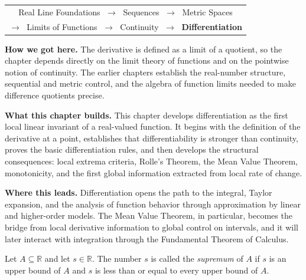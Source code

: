 \begin{tcolorbox}[colback=gray!6, colframe=gray!40, arc=2pt,
  left=8pt, right=8pt, top=6pt, bottom=6pt,
  title={\small\textbf{Differentiation}},
  fonttitle=\small\bfseries]

\begin{center}
\small
\begin{tabular}{c}
Real Line Foundations $\;\to\;$ Sequences $\;\to\;$ Metric Spaces \\[2pt]
$\to\;$ Limits of Functions $\;\to\;$ Continuity $\;\to\;$ \textbf{Differentiation}
\end{tabular}
\end{center}

\medskip
\noindent\textbf{How we got here.}
The derivative is defined as a limit of a quotient, so the chapter depends
directly on the limit theory of functions and on the pointwise notion of
continuity. The earlier chapters establish the real-number structure,
sequential and metric control, and the algebra of function limits needed to
make difference quotients precise.

\medskip
\noindent\textbf{What this chapter builds.}
This chapter develops differentiation as the first local linear invariant of a
real-valued function. It begins with the definition of the derivative at a
point, establishes that differentiability is stronger than continuity, proves
the basic differentiation rules, and then develops the structural consequences:
local extrema criteria, Rolle's Theorem, the Mean Value Theorem, monotonicity,
and the first global information extracted from local rate of change.

\medskip
\noindent\textbf{Where this leads.}
Differentiation opens the path to the integral, Taylor expansion, and the
analysis of function behavior through approximation by linear and higher-order
models. The Mean Value Theorem, in particular, becomes the bridge from local
derivative information to global control on intervals, and it will later
interact with integration through the Fundamental Theorem of Calculus.

\end{tcolorbox}




\begin{tcolorbox}[colback=defbox, colframe=defborder, arc=2pt,
  left=6pt, right=6pt, top=4pt, bottom=4pt,
  title={\small\textbf{Definition (Supremum)}},
  fonttitle=\small\bfseries]
\begin{definition}
\label{def:supremum}
Let $A \subseteq \mathbb{R}$ and let $s \in \mathbb{R}$. The number $s$ is called the
\emph{supremum} of $A$ if $s$ is an upper bound of $A$ and $s$ is less than or equal to
every upper bound of $A$.
\end{definition}
\end{tcolorbox}

